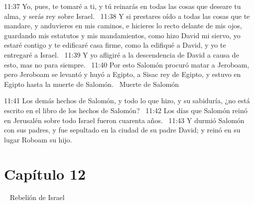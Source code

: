 11:37 Yo, pues, te tomaré a ti, y tú reinarás en todas las cosas que deseare tu alma, y serás rey sobre Israel.  
11:38 Y si prestares oído a todas las cosas que te mandare, y anduvieres en mis caminos, e hicieres lo recto delante de mis ojos, guardando mis estatutos y mis mandamientos, como hizo David mi siervo, yo estaré contigo y te edificaré casa firme, como la edifiqué a David, y yo te entregaré a Israel.  
11:39 Y yo afligiré a la descendencia de David a causa de esto, mas no para siempre.  
11:40 Por esto Salomón procuró matar a Jeroboam, pero Jeroboam se levantó y huyó a Egipto, a Sisac rey de Egipto, y estuvo en Egipto hasta la muerte de Salomón.  
Muerte de Salomón  

11:41 Los demás hechos de Salomón, y todo lo que hizo, y su sabiduría, ¿no está escrito en el libro de los hechos de Salomón?  
11:42 Los días que Salomón reinó en Jerusalén sobre todo Israel fueron cuarenta años.  
11:43 Y durmió Salomón con sus padres, y fue sepultado en la ciudad de su padre David; y reinó en su lugar Roboam su hijo.  
\section*{Capítulo 12} 
Rebelión de Israel  


